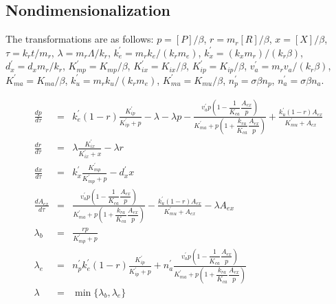 \documentclass[11pt]{article}
\begin{document}
{\subsection{Nondimensionalization}
The transformations are as follows:
$p=[P]/\beta$, $r=m_r[R]/\beta$, $x=[X]/\beta$, $\tau=k_r t/m_r$, $\lambda=m_r\Lambda/k_r$, $k_e^\prime=m_rk_e/(k_rm_e)$, $k_x^\prime=(k_xm_r)/(k_r\beta)$, $d_x^\prime = d_xm_r/k_r$, $K_{mp}^\prime = K_{mp}/\beta$, $K_{ix}^\prime = K_{ix}/\beta$, $K_{ip}^{\prime}=K_{ip}/\beta$, $v_a^\prime=m_rv_a/(k_r\beta)$, $K_{ma}^\prime=K_{ma}/\beta$,  $k_{u}^{\prime}=m_rk_u/(k_rm_e)$, $K_{mu}^{\prime}=K_{mu}/\beta$, $n_p^\prime=\sigma  \beta n_p$, $n_a^\prime=\sigma  \beta n_a$.

\small
\allowdisplaybreaks[1]
\begin{eqnarray}
\frac{dp}{d\tau} &=& k_e^{\prime}(1-r)\frac{K_{ip}^\prime}{K_{ip}^{\prime}+p}-\lambda-\lambda p-\frac{v_a^{\prime}p\left(1-\dfrac{1}{K_{ca}}\dfrac{A_{ex}}{p}\right)}{K_{ma}^{\prime}+p\left(1+\dfrac{k_{ra}}{K_{ca}}\dfrac{A_{ex}}{p}\right)} +\frac{k_u^{\prime}(1-r) A_{ex}}{K_{mu}^{\prime}+A_{ex}} \label{eq1:dpdtau_nd1}\\
\frac{dr}{d\tau} &=& \lambda\frac{K_{ix}^{\prime}}{K_{ix}^\prime+x}-\lambda r \label{eq:drdtau_nd1}\\
\frac{dx}{d\tau} &=& k_x^{\prime}\frac{K_{mp}^{\prime}}{K_{mp}^{\prime}+p}-d_x^{\prime}x \label{eq:dxdtau_nd1}\\
\frac{dA_{ex}}{d\tau} &=& \frac{v_a^{\prime}p\left(1-\dfrac{1}{K_{ca}}\dfrac{A_{ex}}{p}\right)}{K_{ma}^{\prime}+p\left(1+\dfrac{k_{ra}}{K_{ca}}\dfrac{A_{ex}}{p}\right)} -\frac{k_u^{\prime}(1-r) A_{ex}}{K_{mu}^{\prime}+A_{ex}}-\lambda A_{ex}\\
\lambda_b &=& \frac{rp}{K_{mp}^\prime+p} \\
\lambda_e &=& n_p^{\prime}k_e^{\prime}(1-r)\frac{K_{ip}^\prime}{K_{ip}^{\prime}+p} +n_a^{\prime} \frac{v_a^{\prime}p\left(1-\dfrac{1}{K_{ca}}\dfrac{A_{ex}}{p}\right)}{K_{ma}^{\prime}+p\left(1+\dfrac{k_{ra}}{K_{ca}}\dfrac{A_{ex}}{p}\right)}\\
\lambda &=& \min\{\lambda_b, \lambda_e\}
  \end{eqnarray}
  
}
\end{document}
